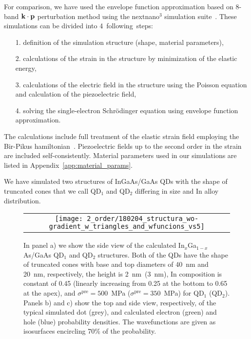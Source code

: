 For comparison, we have used the envelope function approximation based on 8-band ${\bf k}\cdot{\bf p}$ perturbation method using the nextnano$^3$ simulation suite~\cite{Birner:07}. These simulations can be divided into 4~following~steps:
\begin{itemize}
	\item [1.] definition of the simulation structure (shape, material parameters),
	\item[2.] calculations of the strain in the structure by minimization of the elastic energy,
	\item[3.] calculations of the electric field in the structure using the Poisson equation and calculation of the piezoelectric field,
	\item[4.] solving the single-electron Schrödinger equation using envelope function approximation.
\end{itemize}
%
The calculations include full treatment of the elastic strain field employing the Bir-Pikus hamiltonian~\cite{BirPik}. Piezoelectric fields up to the second order in the strain are included self-consistently. Material parameters used in our simulations are listed in Appendix~\ref{app:material_params}. 





We have simulated two structures of InGaAs/GaAs QDs with the shape of truncated cones that we call QD$_1$ and QD$_2$ differing in size and In alloy distribution.
%
\begin{figure}[!ht]
	\renewcommand{\tabcolsep}{2pt}
	\begin{center}
		\begin{tabular}{c}
			\texttt{[image: 2\_order/180204\_structura\_wo-gradient\_w\_triangles\_and\_wfuncions\_vs5]} \\ 
		\end{tabular}
	\end{center}
	\caption{In panel a) we show the side view of the calculated In$_{{x}}$Ga$_{1-x}$As/GaAs QD$_1$ and QD$_2$ structures. Both of the QDs have the shape of truncated cones with base and top diameters of 40~nm and 20~nm, respectively, the height is 2~nm~(3~nm), In composition is constant of 0.45 (linearly increasing from 0.25 at the bottom to 0.65 at the apex), and $\sigma^\text{pre}=500$~MPa ($\sigma^\text{pre}=350$~MPa) for QD$_1$ (QD$_2$). Panels b) and c) show the top and side view, respectively, of the typical simulated dot (grey), and calculated electron (green) and hole (blue) probability densities. The wavefunctions are given as isosurfaces encircling 70\% of the probability.
		\label{fig:2order:QDStruct}}
\end{figure}

